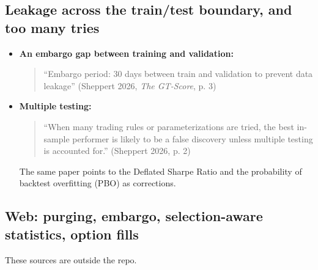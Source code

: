\documentclass{article}
\begin{document}
\subsection{Leakage across the train/\allowbreak{}test boundary, and too many tries}

\begin{itemize}

\item \textbf{An embargo gap between training and validation:}

\begin{quote}``Embargo period: 30 days between train and validation to prevent data leakage'' (Sheppert 2026, \emph{The GT-Score}, p. 3)\end{quote}

\item \textbf{Multiple testing:}

\begin{quote}``When many trading rules or parameterizations are tried, the best in-sample performer is likely to be a false discovery unless multiple testing is accounted for.'' (Sheppert 2026, p. 2)\end{quote}

The same paper points to the Deflated Sharpe Ratio and the probability of backtest overfitting (PBO) as corrections.

\end{itemize}

\subsection{Web: purging, embargo, selection-aware statistics, option fills}

These sources are outside the repo.
\end{document}

